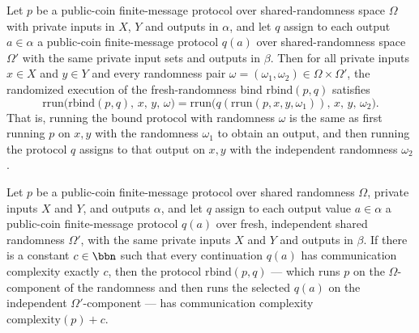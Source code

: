 \begin{theorem}
\label{CommunicationComplexity.PublicCoin.FiniteMessage.Protocol.rbind_rrun}
\leanok
{}
Let $p$ be a public-coin finite-message protocol over shared-randomness space $\Omega$
with private inputs in $X$, $Y$ and outputs in $\alpha$, and let $q$ assign to each
output $a \in \alpha$ a public-coin finite-message protocol $q(a)$ over
shared-randomness space $\Omega'$ with the same private input sets and outputs in
$\beta$. Then for all private inputs $x \in X$ and $y \in Y$ and every randomness pair
$\omega = (\omega_1, \omega_2) \in \Omega \times \Omega'$, the randomized execution of
the fresh-randomness bind $\mathrm{rbind}(p, q)$ satisfies
\[
  \mathrm{rrun}\bigl(\mathrm{rbind}(p, q),\, x,\, y,\, \omega\bigr)
= \mathrm{rrun}\bigl(q(\mathrm{rrun}(p, x, y, \omega_1)),\, x,\, y,\, \omega_2\bigr).
\]
That is, running the bound protocol with randomness $\omega$ is the same as first
running $p$ on $x, y$ with the randomness $\omega_1$ to obtain an output, and then
running the protocol $q$ assigns to that output on $x, y$ with the independent
randomness $\omega_2$.
\end{theorem}

\begin{theorem}
\label{CommunicationComplexity.PublicCoin.FiniteMessage.Protocol.rbind_complexity_const}
\leanok
{}
Let $p$ be a public-coin finite-message protocol over shared randomness $\Omega$,
private inputs $X$ and $Y$, and outputs $\alpha$, and let $q$ assign to each output
value $a \in \alpha$ a public-coin finite-message protocol $q(a)$ over fresh,
independent shared randomness $\Omega'$, with the same private inputs $X$ and $Y$ and
outputs in $\beta$. If there is a constant $c \in \bbn$ such that every continuation
$q(a)$ has communication complexity exactly $c$, then the protocol $\mathrm{rbind}(p,
q)$ — which runs $p$ on the $\Omega$-component of the randomness and then runs the
selected $q(a)$ on the independent $\Omega'$-component — has communication complexity
$\mathrm{complexity}(p) + c$.
\end{theorem}

